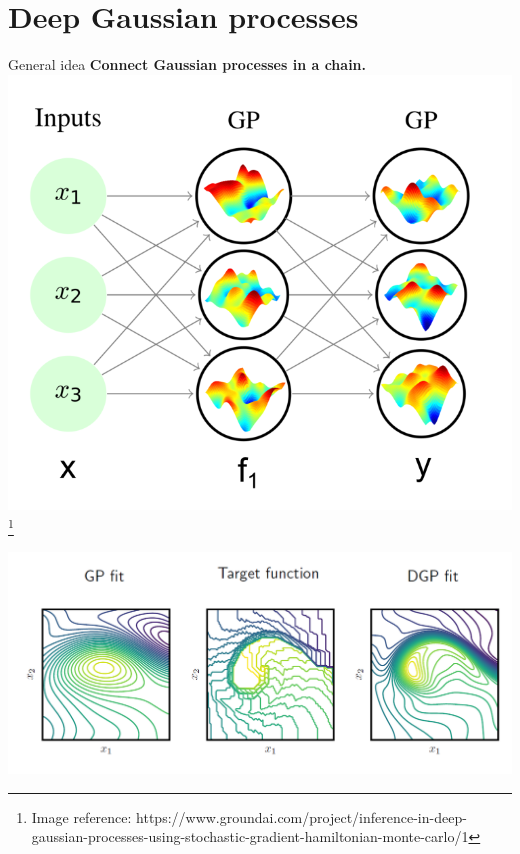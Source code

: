 \documentclass[10pt]{beamer}
\begin{document}
\section{Deep Gaussian processes}

\begin{frame}{General idea}
    \textbf{Connect Gaussian processes in a chain.}
    \centering
    \includegraphics[scale = 0.17]{imgs/Deep_gp.png}\footnote{Image reference: https://www.groundai.com/project/inference-in-deep-gaussian-processes-using-stochastic-gradient-hamiltonian-monte-carlo/1}

    \includegraphics[scale = 0.2]{imgs/Deep_gp_fit.PNG}
\end{frame}
\end{document}
